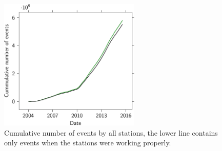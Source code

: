 \begin{figure}
    \centering
    \includegraphics[width=0.6\textwidth]
                    {plots/experiment/luminosity_network}
    \caption{Cumulative number of events by all stations, the lower line contains only events when the stations were working properly.}
    \label{fig:luminosity_network}
\end{figure}

